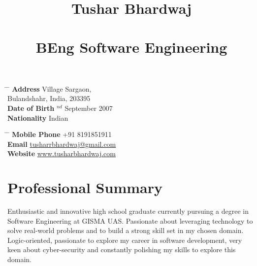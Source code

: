\documentclass[10pt]{article} %
\begin{document}

\title{Tushar Bhardwaj \\\\\small{BEng Software Engineering}} %


\parbox{0.5\textwidth}{ %
\begin{tabbing} %
\hspace{3cm} \= \hspace{4cm} \= \kill %
{\bf Address} \> Village Sargaon,\\ %
\> Bulandshahr, India, 203395 \\ %
{\bf Date of Birth} $^{nd}$ September 2007 \\ %
{\bf Nationality} \> Indian %
\end{tabbing}}
\hfill %
\parbox{0.5\textwidth}{ %
\begin{tabbing} %
\hspace{3cm} \= \hspace{4cm} \= \kill %
{\bf Mobile Phone} \> +91 8191851911 \\ %
{\bf Email} \> \href{mailto:john@smith.com}{\color{blue} tusharrbhardwaj@gmail.com} \\ %
{\bf Website} \> \href{tusharbhardwaj.com}{\color{blue} www.tusharbhardwaj.com} \\ %
\end{tabbing}}


\section{Professional Summary}

Enthusiastic and innovative high school graduate currently pursuing a degree in
Software Engineering at GISMA UAS. 
Passionate about leveraging technology to solve real-world problems and to build a strong skill set in my chosen domain.
Logic-oriented, passionate to explore my career in software development, very keen about cyber-security and constantly polishing my skills to explore this domain.
\end{document}
